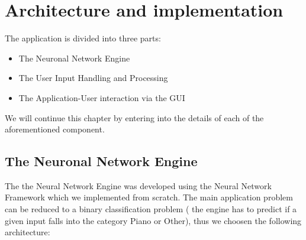 \chapter{Architecture and implementation}

The application is divided into three parts:
	\begin{itemize}
		\addtolength{\itemindent}{1cm}
		\item The Neuronal Network Engine
		\item The User Input Handling and Processing
		\item The Application-User interaction via the GUI
	\end{itemize}

We will continue this chapter by entering into the details of each of the aforementioned component.

\section{The Neuronal Network Engine}

The the Neural Network Engine was developed using the Neural Network Framework which we implemented from scratch.
The main application problem can be reduced to a binary classification problem ( the engine has to predict if a given
input falls into the category Piano or Other), thus we choosen the following architecture:



